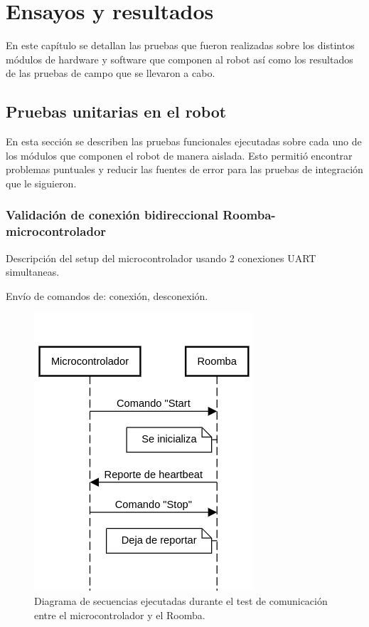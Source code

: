 
\chapter{Ensayos y resultados} %

\label{Capitulo4}

En este capítulo se detallan las pruebas que fueron realizadas sobre los distintos módulos de hardware y software que componen al robot así como los resultados de las pruebas de campo que se llevaron a cabo.

\section{Pruebas unitarias en el robot}

En esta sección se describen las pruebas funcionales ejecutadas sobre cada uno de los módulos que componen el robot de manera aislada. Esto permitió encontrar problemas puntuales y reducir las fuentes de error para las pruebas de integración que le siguieron.

\subsection{Validación de conexión bidireccional Roomba-microcontrolador}

Descripción del setup del microcontrolador usando 2 conexiones UART simultaneas.

Envío de comandos de: conexión, desconexión.

\begin{figure}[ht]
    \centering
    \includegraphics[scale=0.6]{./Figures/comm_test2.png}
    \caption{Diagrama de secuencias ejecutadas durante el test de comunicación entre el microcontrolador y el Roomba.}
    \label{fig:secMicroRoomba}
\end{figure}


